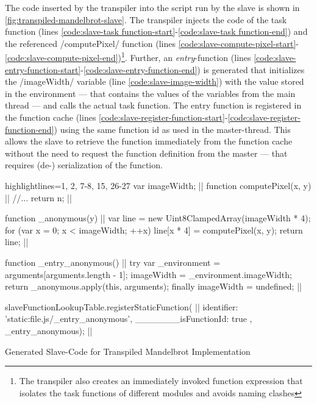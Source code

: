The code inserted by the transpiler into the script run by the slave is shown in \cref{fig:transpiled-mandelbrot-slave}. The transpiler injects the code of the task function (lines \ref{code:slave-task function-start}-\ref{code:slave-task function-end}) and the referenced \javascriptinline/computePixel/ function (lines \ref{code:slave-compute-pixel-start}-\ref{code:slave-compute-pixel-end})\footnote{The transpiler also creates an immediately invoked function expression that isolates the task functions of different modules and avoids naming clashes}. Further, an \textit{entry}-function (lines \ref{code:slave-entry-function-start}-\ref{code:slave-entry-function-end}) is generated that initializes the \javascriptinline/imageWidth/ variable (line \ref{code:slave-image-width}) with the value stored in the environment --- that contains the values of the variables from the main thread --- and calls the actual task function. The entry function is registered in the function cache (lines \ref{code:slave-register-function-start}-\ref{code:slave-register-function-end}) using the same function id as used in the master-thread. This allows the slave to retrieve the function immediately from the function cache without the need to request the function definition from the master --- that requires (de-) serialization of the function.

\begin{listing}
\begin{javascriptcode*}{highlightlines={1, 2, 7-8, 15, 26-27}}
var imageWidth; |$\label{code:slave-image-width}$|
function computePixel(x, y) { |$\label{code:slave-compute-pixel-start}$|
	//...
	return n;
}|$\label{code:slave-compute-pixel-end}$|

function _anonymous(y) { |$\label{code:slave-task function-start}$|
	var line = new Uint8ClampedArray(imageWidth * 4);
	for (var x = 0; x < imageWidth; ++x) {
		line[x * 4] = computePixel(x, y);
	}
	return line;
}|$\label{code:slave-task function-end}$|

function _entry_anonymous() { |$\label{code:slave-entry-function-start}$|
	try {
		var _environment = arguments[arguments.length - 1];
		imageWidth = _environment.imageWidth;
		return _anonymous.apply(this, arguments);
	} finally {
		imageWidth = undefined;
	}
}|$\label{code:slave-entry-function-end}$|

slaveFunctionLookupTable.registerStaticFunction({ |$\label{code:slave-register-function-start}$|
	identifier: 'static:file.js/_entry_anonymous',
	_______isFunctionId: true
}, _entry_anonymous); |$\label{code:slave-register-function-end}$|
\end{javascriptcode*}
\caption{Generated Slave-Code for Transpiled Mandelbrot Implementation}
\label{fig:transpiled-mandelbrot-slave}
\end{listing}

